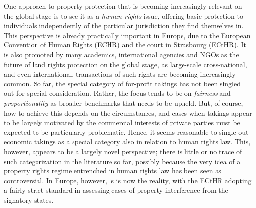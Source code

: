  One approach to property protection that is becoming increasingly relevant on the global stage is to see it as a {\it human rights} issue, offering basic protection to individuals independently of the particular jurisdiction they find themselves in. This perspective is already practically important in Europe, due to the European Convention of Human Rights (ECHR) and the court in Strasbourg (ECtHR). It is also promoted by many academics, international agencies and NGOs as the future of land rights protection on the global stage, as large-scale cross-national, and even international, transactions of such rights are becoming increasingly common. So far, the special category of for-profit takings has not been singled out for special consideration. Rather, the focus tends to be on {\it fairness} and {\it proportionality} as broader benchmarks that needs to be upheld. But, of course, how to achieve this depends on the circumstances, and cases when takings appear to be largely motivated by the commercial interests of private parties must be expected to be particularly problematic. Hence, it seems reasonable to single out economic takings as a special category also in relation to human rights law. This, however, appears to be a largely novel perspective; there is little or  no trace of such categorization in the literature so far, possibly because the very idea of a property rights regime entrenched in human rights law has been seen as controversial. In Europe, however, is is now the reality, with the ECtHR adopting a fairly strict standard in assessing cases of property interference from the signatory states.


